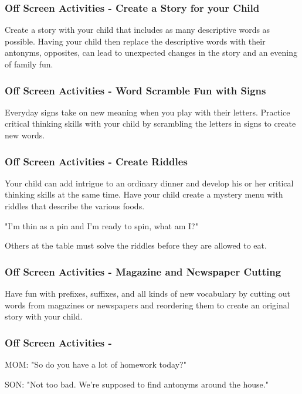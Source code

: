 \subsubsection{Off Screen Activities - Create a Story for your Child}

Create a story with your child that includes as many descriptive words as possible.
Having your child then replace the descriptive words with their antonyms, opposites, can lead to unexpected changes in the story and an evening of family fun.

\subsubsection{Off Screen Activities - Word Scramble Fun with Signs}

Everyday signs take on new meaning when you play with their letters.
Practice critical thinking skills with your child by scrambling the letters in signs to create new words.

\subsubsection{Off Screen Activities - Create Riddles}

Your child can add intrigue to an ordinary dinner and develop his or her critical thinking skills at the same time.
Have your child create a mystery menu with riddles that describe the various foods.

"I'm thin as a pin and I'm ready to spin, what am I?"

Others at the table must solve the riddles before they are allowed to eat.

\subsubsection{Off Screen Activities - Magazine and Newspaper Cutting}

Have fun with prefixes, suffixes, and all kinds of new vocabulary by cutting out words from magazines or newspapers and reordering them to create an original story with your child.

\subsubsection{Off Screen Activities - }

MOM: "So do you have a lot of homework today?"

SON: "Not too bad.
We're supposed to find antonyms around the house."

